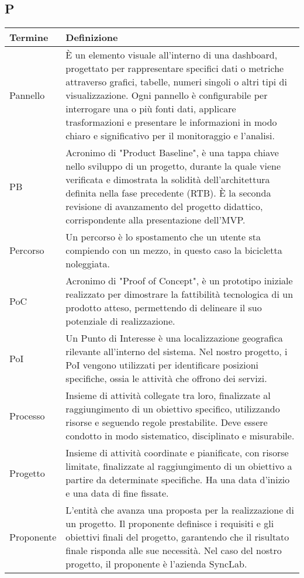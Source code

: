 \documentclass[10pt]{article}
\begin{document}
\subsection{P} %
\begin{longtable}{|>{\centering\arraybackslash}m{2.5cm}|>{\arraybackslash}m{12.5cm}|}
\hline
\rowcolor[gray]{0.8}
\textbf{Termine} & \textbf{Definizione}\\
\endhead
\hline
Pannello & È un elemento visuale all'interno di una dashboard, progettato per rappresentare specifici dati o metriche attraverso grafici, tabelle, numeri singoli o altri tipi di visualizzazione. Ogni pannello è configurabile per interrogare una o più fonti dati, applicare trasformazioni e presentare le informazioni in modo chiaro e significativo per il monitoraggio e l'analisi.\\
\hline
PB & Acronimo di "Product Baseline", è una tappa chiave nello sviluppo di un progetto, durante la quale viene verificata e dimostrata la solidità dell'architettura definita nella fase precedente (RTB). È la seconda revisione di avanzamento del progetto didattico, corrispondente alla presentazione dell'MVP.\\
\hline
Percorso & Un percorso è lo spostamento che un utente sta compiendo con un mezzo, in questo caso la bicicletta noleggiata.\\
\hline
PoC & Acronimo di "Proof of Concept", è un prototipo iniziale realizzato per dimostrare la fattibilità tecnologica di un prodotto atteso, permettendo di delineare il suo potenziale di realizzazione.\\
\hline
PoI & Un Punto di Interesse è una localizzazione geografica rilevante all'interno del sistema. Nel nostro progetto, i PoI vengono utilizzati per identificare posizioni specifiche, ossia le attività che offrono dei servizi.\\
\hline
Processo & Insieme di attività collegate tra loro, finalizzate al raggiungimento di un obiettivo specifico, utilizzando risorse e seguendo regole prestabilite. Deve essere condotto in modo sistematico, disciplinato e misurabile.\\
\hline
Progetto & Insieme di attività coordinate e pianificate, con risorse limitate, finalizzate al raggiungimento di un obiettivo a partire da determinate specifiche. Ha una data d'inizio e una data di fine fissate.\\
\hline
Proponente & L'entità che avanza una proposta per la realizzazione di un progetto. Il proponente definisce i requisiti e gli obiettivi finali del progetto, garantendo che il risultato finale risponda alle sue necessità. Nel caso del nostro progetto, il proponente è l'azienda SyncLab.\\

\end{longtable}
\end{document}
